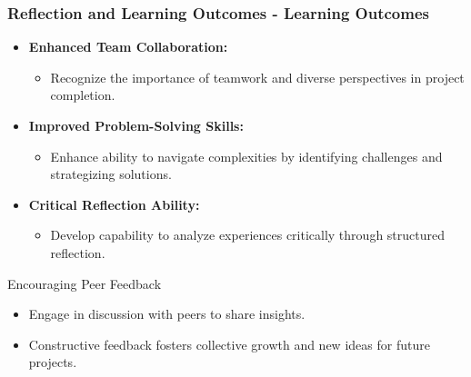 \documentclass[aspectratio=169]{beamer}
\begin{document}
\begin{frame}[fragile]
    \frametitle{Reflection and Learning Outcomes - Learning Outcomes}
    \begin{itemize}
        \item \textbf{Enhanced Team Collaboration:} 
            \begin{itemize}
                \item Recognize the importance of teamwork and diverse perspectives in project completion.
            \end{itemize}
        
        \item \textbf{Improved Problem-Solving Skills:}
            \begin{itemize}
                \item Enhance ability to navigate complexities by identifying challenges and strategizing solutions.
            \end{itemize}

        \item \textbf{Critical Reflection Ability:}
            \begin{itemize}
                \item Develop capability to analyze experiences critically through structured reflection.
            \end{itemize}
    \end{itemize}

    \begin{block}{Encouraging Peer Feedback}
        \begin{itemize}
            \item Engage in discussion with peers to share insights.
            \item Constructive feedback fosters collective growth and new ideas for future projects.
        \end{itemize}
    \end{block}
\end{frame}
\end{document}
